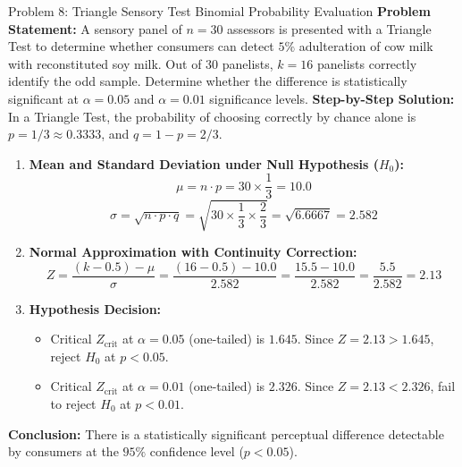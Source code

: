 \documentclass[11pt,a4paper,oneside]{article}
\begin{document}
\begin{examplebox}{Problem 8: Triangle Sensory Test Binomial Probability Evaluation}
\textbf{Problem Statement:}
A sensory panel of $n = 30$ assessors is presented with a Triangle Test to determine whether consumers can detect $5\%$ adulteration of cow milk with reconstituted soy milk. Out of 30 panelists, $k = 16$ panelists correctly identify the odd sample.
Determine whether the difference is statistically significant at $\alpha = 0.05$ and $\alpha = 0.01$ significance levels.
\vspace{0.2cm}
\textbf{Step-by-Step Solution:}
In a Triangle Test, the probability of choosing correctly by chance alone is $p = 1/3 \approx 0.3333$, and $q = 1 - p = 2/3$.
\begin{enumerate}
    \item \textbf{Mean and Standard Deviation under Null Hypothesis ($H_0$):}
    $$\mu = n \cdot p = 30 \times \frac{1}{3} = 10.0$$
    $$\sigma = \sqrt{n \cdot p \cdot q} = \sqrt{30 \times \frac{1}{3} \times \frac{2}{3}} = \sqrt{6.6667} = 2.582$$
    
    \item \textbf{Normal Approximation with Continuity Correction:}
    $$Z = \frac{(k - 0.5) - \mu}{\sigma} = \frac{(16 - 0.5) - 10.0}{2.582} = \frac{15.5 - 10.0}{2.582} = \frac{5.5}{2.582} = \mathbf{2.13}$$
    
    \item \textbf{Hypothesis Decision:}
    \begin{itemize}
        \item Critical $Z_{\text{crit}}$ at $\alpha = 0.05$ (one-tailed) is \textbf{$1.645$}. Since $Z = 2.13 > 1.645$, reject $H_0$ at $p < 0.05$.
        \item Critical $Z_{\text{crit}}$ at $\alpha = 0.01$ (one-tailed) is \textbf{$2.326$}. Since $Z = 2.13 < 2.326$, fail to reject $H_0$ at $p < 0.01$.
    \end{itemize}
\end{enumerate}
\textbf{Conclusion:} There is a statistically significant perceptual difference detectable by consumers at the $95\%$ confidence level ($p < 0.05$).
\end{examplebox}
\end{document}
